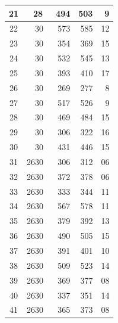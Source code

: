 \documentclass{article}
\def\TWO{\textcolor{G}{28}}
\def\THR{\textcolor{B}{30}}
\def\FOR{\textcolor{A}{26\text{-}30}}
\begin{document}
\begin{longtable}[c]{|c|r|r|r|r|}
    21 & \TWO\ & 494 & 503 & 9\\
    \midrule%
    22 & \THR\ & 573 & 585 & 12\\\midrule
    23 & \THR\ & 354 & 369 & 15\\\midrule
    24 & \THR\ & 532 & 545 & 13\\\midrule
    25 & \THR\ & 393 & 410 & 17\\\midrule
    26 & \THR\ & 269 & 277 & 8\\\midrule
    27 & \THR\ & 517 & 526 & 9\\\midrule
    28 & \THR\ & 469 & 484 & 15\\\midrule
    29 & \THR\ & 306 & 322 & 16\\\midrule
    30 & \THR\ & 431 & 446 & 15\\
    \midrule%
    31 & \FOR\ & 306 & 312 & 06\\\midrule
    32 & \FOR\ & 372 & 378 & 06\\\midrule
    33 & \FOR\ & 333 & 344 & 11\\\midrule
    34 & \FOR\ & 567 & 578 & 11\\\midrule
    35 & \FOR\ & 379 & 392 & 13\\\midrule
    36 & \FOR\ & 490 & 505 & 15\\\midrule
    37 & \FOR\ & 391 & 401 & 10\\\midrule
    38 & \FOR\ & 509 & 523 & 14\\\midrule
    39 & \FOR\ & 369 & 377 & 08\\\midrule
    40 & \FOR\ & 337 & 351 & 14\\\midrule
    41 & \FOR\ & 365 & 373 & 08\\
    \bottomrule
\end{longtable}
\text{\\}
\end{document}
